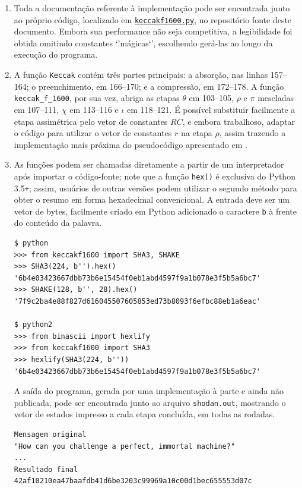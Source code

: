 \documentclass{article}
\begin{document}
\begin{enumerate}[label=(\alph*)]

\item Toda a documentação referente à implementação pode ser encontrada junto ao
próprio código, localizado em
\href{https://github.com/zambonin/UFSC-INE5429/blob/master/keccak/keccakf1600.py}
{\texttt{keccakf1600.py}}, no repositório fonte deste documento. Embora sua
performance não seja competitiva, a legibilidade foi obtida omitindo constantes
`'mágicas`', escolhendo gerá-las ao longo da execução do programa.

\item A função \texttt{Keccak} contém três partes principais: a absorção, nas
linhas 157--164; o preenchimento, em 166--170; e a compressão, em 172--178. A
função \texttt{keccak\_f\_1600}, por sua vez, abriga as etapas $\theta$ em
103--105, $\rho$ e $\pi$ mescladas em 107--111, $\chi$ em 113--116 e $\iota$ em
118--121. É possível substituir facilmente a etapa assimétrica pelo vetor de
constantes $RC$, e embora trabalhoso, adaptar o código para utilizar o vetor de
constantes $r$ na etapa $\rho$, assim trazendo a implementação mais próxima do
pseudocódigo apresentado em \cite{KeccakImplementation}.

\item As funções podem ser chamadas diretamente a partir de um interpretador
após importar o código-fonte; note que a função \texttt{hex()} é exclusiva do
Python 3.5\texttt{+}; assim, usuários de outras versões podem utilizar o
segundo método para obter o resumo em forma hexadecimal convencional. A entrada
deve ser um vetor de bytes, facilmente criado em Python adicionado o caractere
\texttt{b} à frente do conteúdo da palavra.

\begin{verbatim}
$ python
>>> from keccakf1600 import SHA3, SHAKE
>>> SHA3(224, b'').hex()
'6b4e03423667dbb73b6e15454f0eb1abd4597f9a1b078e3f5b5a6bc7'
>>> SHAKE(128, b'', 28).hex()
'7f9c2ba4e88f827d616045507605853ed73b8093f6efbc88eb1a6eac'

$ python2
>>> from binascii import hexlify
>>> from keccakf1600 import SHA3
>>> hexlify(SHA3(224, b''))
'6b4e03423667dbb73b6e15454f0eb1abd4597f9a1b078e3f5b5a6bc7'
\end{verbatim}

A saída do programa, gerada por uma implementação à parte e ainda não
publicada, pode ser encontrada junto ao arquivo \texttt{shodan.out}, mostrando
o vetor de estados impresso a cada etapa concluída, em todas as rodadas.

\begin{verbatim}
Mensagem original
"How can you challenge a perfect, immortal machine?"
...
Resultado final
42af10210ea47baafdb41d6be3203c99969a10c00d1bec655553d07c
\end{verbatim}

\end{enumerate}
\end{document}
